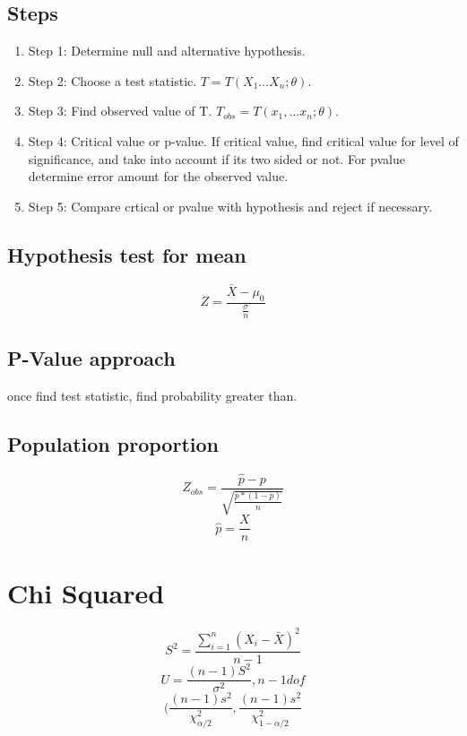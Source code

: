 \documentclass[11pt]{article}
\begin{document}
\subsection{Steps}
\begin{enumerate}
  \item Step 1: Determine null and alternative hypothesis.
  \item Step 2: Choose a test statistic. $T= T(X_1\dots X_n;\theta)$.
  \item Step 3: Find observed value of T. $T_{obs}= T(x_1,\dots x_n;\theta)$.
  \item Step 4: Critical value or p-value. If critical value, find critical
    value for level of significance, and take into account if its two sided or
    not. For pvalue determine error amount for the observed value.
  \item Step 5: Compare crtical or pvalue with hypothesis and reject if
    necessary.
\end{enumerate}

\subsection{Hypothesis test for mean}
\begin{equation}
  Z = \frac{\bar{X}- \mu_0}{\frac{\sigma}{n}}
\end{equation}
\subsection{P-Value approach}
\par once find test statistic, find probability greater than.
\subsection{Population proportion}
\begin{equation}
  Z_{obs} = \frac{\hat{p} - p}{\sqrt{\frac{p*(1-p)}{n}}}
\end{equation}
\begin{equation}
  \hat{p} = \frac{X}{n}
\end{equation}
\section{Chi Squared}
\begin{equation}
  S^2=\frac{\sum_{i=1}^n (X_i-\bar{X})^2}{n-1}
\end{equation}
\begin{equation}
  U = \frac{(n-1)S^2}{\sigma^2}, n-1 dof
\end{equation}
\begin{equation}
  (\frac{(n-1)s^2}{\chi_{\alpha/2}^2},\frac{(n-1)s^2}{\chi_{1-\alpha/2}^2}
\end{equation}
\end{document}
